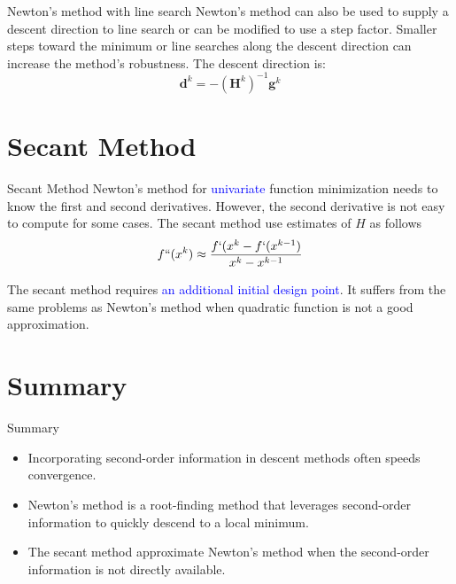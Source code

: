 \documentclass{beamer}
\begin{document}
\begin{frame}{Newton's method with line search}
Newton’s method can also be used to supply a descent direction to line search or can be modified to use a step factor. Smaller steps toward the minimum or line searches along the descent direction can increase the method’s robustness. The descent direction is:
    \begin{equation*}
        \boldsymbol{d}^k = -(\boldsymbol{H}^k)^{-1}\boldsymbol{g}^k
    \end{equation*}

\end{frame}

\section{Secant Method}
\begin{frame}{Secant Method}
Newton's method for \textcolor{blue}{univariate} function minimization needs to know the first and second derivatives. However, the second derivative is not easy to compute for some cases. The secant method use estimates of $H$ as follows
\begin{gather*}
    f``(x^k) \approx \frac{f`(x^k - f`(x^{k-1})} {x^k-x^{k-1}}
\end{gather*}

The secant method requires \textcolor{blue}{an additional initial design point}. It suffers from the same problems as Newton's method when quadratic function is not a good approximation.

\end{frame}



\section{Summary}
\begin{frame}{Summary}
    \begin{itemize}
        \item Incorporating second-order information in descent methods often speeds convergence.
        \item Newton’s method is a root-finding method that leverages second-order information to quickly descend to a local minimum.
        \item The secant method approximate Newton’s method when the second-order information is not directly available.
    \end{itemize}
\end{frame}
\end{document}
